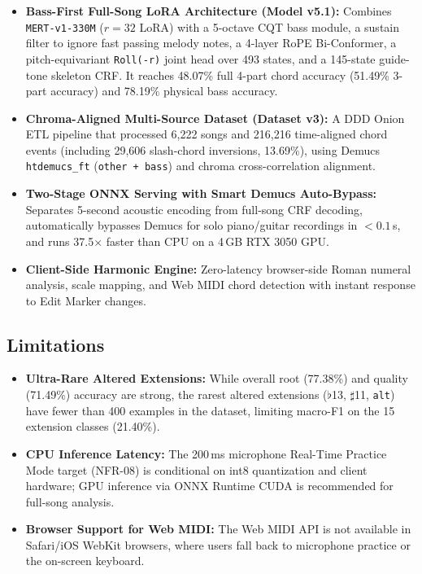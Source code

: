 \documentclass[a4paper]{article}
\begin{document}
\begin{itemize}
    \item \textbf{Bass-First Full-Song LoRA Architecture (Model v5.1):} Combines \texttt{MERT-v1-330M} ($r=32$ LoRA) with a 5-octave CQT bass module, a sustain filter to ignore fast passing melody notes, a 4-layer RoPE Bi-Conformer, a pitch-equivariant \texttt{Roll(-r)} joint head over 493 states, and a 145-state guide-tone skeleton CRF. It reaches 48.07\% full 4-part chord accuracy (51.49\% 3-part accuracy) and 78.19\% physical bass accuracy.
    \item \textbf{Chroma-Aligned Multi-Source Dataset (Dataset v3):} A DDD Onion ETL pipeline that processed 6,222 songs and 216,216 time-aligned chord events (including 29,606 slash-chord inversions, 13.69\%), using Demucs \texttt{htdemucs\_ft} (\texttt{other + bass}) and chroma cross-correlation alignment.
    \item \textbf{Two-Stage ONNX Serving with Smart Demucs Auto-Bypass:} Separates 5-second acoustic encoding from full-song CRF decoding, automatically bypasses Demucs for solo piano/guitar recordings in $<0.1$\,s, and runs 37.5$\times$ faster than CPU on a 4\,GB RTX 3050 GPU.
    \item \textbf{Client-Side Harmonic Engine:} Zero-latency browser-side Roman numeral analysis, scale mapping, and Web MIDI chord detection with instant response to Edit Marker changes.
\end{itemize}

\subsection*{Limitations}

\begin{itemize}
    \item \textbf{Ultra-Rare Altered Extensions:} While overall root (77.38\%) and quality (71.49\%) accuracy are strong, the rarest altered extensions ($\flat$13, $\sharp$11, \texttt{alt}) have fewer than 400 examples in the dataset, limiting macro-F1 on the 15 extension classes (21.40\%).
    \item \textbf{CPU Inference Latency:} The 200\,ms microphone Real-Time Practice Mode target (NFR-08) is conditional on int8 quantization and client hardware; GPU inference via ONNX Runtime CUDA is recommended for full-song analysis.
    \item \textbf{Browser Support for Web MIDI:} The Web MIDI API is not available in Safari/iOS WebKit browsers, where users fall back to microphone practice or the on-screen keyboard.
\end{itemize}
\end{document}
